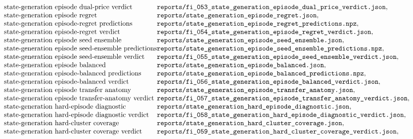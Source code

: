 $$\begin{array}{@{}l@{}l@{}}
\text{state-generation episode dual-price verdict} & \texttt{reports/fi\_053\_state\_generation\_episode\_dual\_price\_verdict.json},\\
\text{state-generation episode regret} & \texttt{reports/state\_generation\_episode\_regret.json},\\
\text{state-generation episode-regret predictions} & \texttt{reports/state\_generation\_episode\_regret\_predictions.npz},\\
\text{state-generation episode-regret verdict} & \texttt{reports/fi\_054\_state\_generation\_episode\_regret\_verdict.json},\\
\text{state-generation episode seed ensemble} & \texttt{reports/state\_generation\_episode\_seed\_ensemble.json},\\
\text{state-generation episode seed-ensemble predictions} & \texttt{reports/state\_generation\_episode\_seed\_ensemble\_predictions.npz},\\
\text{state-generation episode seed-ensemble verdict} & \texttt{reports/fi\_055\_state\_generation\_episode\_seed\_ensemble\_verdict.json},\\
\text{state-generation episode balanced} & \texttt{reports/state\_generation\_episode\_balanced.json},\\
\text{state-generation episode-balanced predictions} & \texttt{reports/state\_generation\_episode\_balanced\_predictions.npz},\\
\text{state-generation episode-balanced verdict} & \texttt{reports/fi\_056\_state\_generation\_episode\_balanced\_verdict.json},\\
\text{state-generation episode transfer anatomy} & \texttt{reports/state\_generation\_episode\_transfer\_anatomy.json},\\
\text{state-generation episode transfer-anatomy verdict} & \texttt{reports/fi\_057\_state\_generation\_episode\_transfer\_anatomy\_verdict.json},\\
\text{state-generation hard-episode diagnostic} & \texttt{reports/state\_generation\_hard\_episode\_diagnostic.json},\\
\text{state-generation hard-episode diagnostic verdict} & \texttt{reports/fi\_058\_state\_generation\_hard\_episode\_diagnostic\_verdict.json},\\
\text{state-generation hard-cluster coverage} & \texttt{reports/state\_generation\_hard\_cluster\_coverage.json},\\
\text{state-generation hard-cluster coverage verdict} & \texttt{reports/fi\_059\_state\_generation\_hard\_cluster\_coverage\_verdict.json},\\

\end{array}$$
